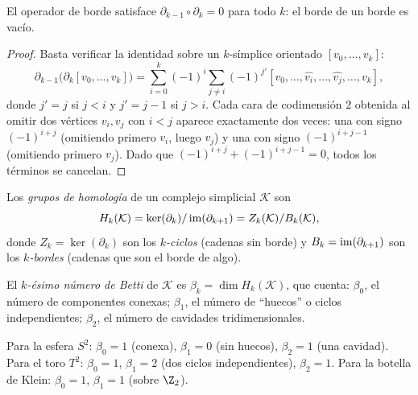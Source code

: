 \begin{proposition}
\label{prop:graphs:boundary-squared}
El operador de borde satisface $\partial_{k-1} \circ \partial_k = 0$ para todo
$k$: el borde de un borde es vac\'io.
\end{proposition}

\begin{proof}
Basta verificar la identidad sobre un $k$-s\'implice orientado
$[v_0, \dots, v_k]$:
\[
  \partial_{k-1}\big(\partial_k [v_0, \dots, v_k]\big)
    = \sum_{i=0}^{k} (-1)^i \sum_{j \neq i} (-1)^{j'}
      [v_0, \dots, \widehat{v_i}, \dots, \widehat{v_j}, \dots, v_k],
\]
donde $j' = j$ si $j < i$ y $j' = j-1$ si $j > i$. Cada cara de codimensi\'on
$2$ obtenida al omitir dos v\'ertices $v_i, v_j$ con $i < j$ aparece exactamente
dos veces: una con signo $(-1)^{i+j}$ (omitiendo primero $v_i$, luego $v_j$) y una
con signo $(-1)^{i+j-1}$ (omitiendo primero $v_j$). Dado que
$(-1)^{i+j} + (-1)^{i+j-1} = 0$, todos los t\'erminos se cancelan.
\end{proof}

\begin{definition}
\label{def:graphs:homology}
Los \emph{grupos de homolog\'ia} de un complejo simplicial $\mathcal{K}$ son
\[
  H_k(\mathcal{K}) = \ker(\partial_k) / \operatorname{im}(\partial_{k+1})
    = Z_k(\mathcal{K}) / B_k(\mathcal{K}),
\]
donde $Z_k = \ker(\partial_k)$ son los \emph{$k$-ciclos} (cadenas sin borde) y
$B_k = \operatorname{im}(\partial_{k+1})$ son los \emph{$k$-bordes} (cadenas que son el borde de
algo).
\end{definition}

\begin{definition}
\label{def:graphs:betti}
El \emph{$k$-\'esimo n\'umero de Betti} de $\mathcal{K}$ es
$\beta_k = \dim H_k(\mathcal{K})$, que cuenta: $\beta_0$, el n\'umero de
componentes conexas; $\beta_1$, el n\'umero de ``huecos'' o ciclos
independientes; $\beta_2$, el n\'umero de cavidades tridimensionales.
\end{definition}

\begin{example}
\label{ex:graphs:betti}
Para la esfera $S^2$: $\beta_0 = 1$ (conexa), $\beta_1 = 0$ (sin huecos),
$\beta_2 = 1$ (una cavidad). Para el toro $T^2$: $\beta_0 = 1$, $\beta_1 = 2$
(dos ciclos independientes), $\beta_2 = 1$. Para la botella de Klein:
$\beta_0 = 1$, $\beta_1 = 1$ (sobre $\Z_2$).
\end{example}

